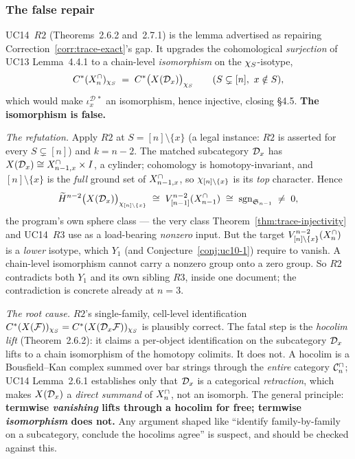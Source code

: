 \subsubsection{The false repair}

\begin{correction}
\label{corr:r2}
UC14~$R2$ (Theorems~2.6.2 and~2.7.1) is the lemma advertised as
repairing Correction~\ref{corr:trace-exact}'s gap. It upgrades the
cohomological \emph{surjection} of UC13 Lemma~4.4.1 to a chain-level
\emph{isomorphism} on the $\chi_{S}$-isotype,
\[
  C^*(X^{\cap}_n)_{\chi_{S}}\;=\;C^*\bigl(X(\mathcal{D}_x)\bigr)_{\chi_{S}}
  \qquad(S\subsetneq[n],\ x\notin S),
\]
which would make $\iota_x^{\mathcal D\,*}$ an isomorphism, hence
injective, closing \S4.5. \textbf{The isomorphism is false.}

\emph{The refutation.} Apply $R2$ at $S=[n]\setminus\{x\}$ (a legal
instance: $R2$ is asserted for every $S\subsetneq[n]$) and $k=n-2$.
The matched subcategory $\mathcal{D}_x$ has $X(\mathcal{D}_x)\cong X^{\cap}_{n-1,x}\times I$, a
cylinder; cohomology is homotopy-invariant, and $[n]\setminus\{x\}$ is
the \emph{full} ground set of $X^{\cap}_{n-1,x}$, so $\chi_{[n]\setminus\{x\}}$ is
its \emph{top} character. Hence
\[
  \widetilde H^{n-2}\bigl(X(\mathcal{D}_x)\bigr)_{\chi_{[n]\setminus\{x\}}}
  \;\cong\;V^{n-2}_{[n-1]}(X^{\cap}_{n-1})
  \;\cong\;\mathrm{sgn}_{\mathfrak{S}_{n-1}}\;\neq\;0,
\]
the program's own sphere class --- the very class
Theorem~\ref{thm:trace-injectivity} and UC14~$R3$ use as a load-bearing
\emph{nonzero} input. But the target $V_{[n]\setminus\{x\}}^{n-2}
(X^{\cap}_n)$ is a \emph{lower} isotype, which $Y_1$ (and
Conjecture~\ref{conj:uc10-1}) require to vanish. A chain-level
isomorphism cannot carry a nonzero group onto a zero group. So $R2$
contradicts both $Y_1$ and its own sibling $R3$, inside one document;
the contradiction is concrete already at $n=3$.

\emph{The root cause.} $R2$'s single-family, cell-level identification
$C^*(X(\mathcal{F}))_{\chi_{S}}=C^*(X(\mathcal{D}_x\mathcal{F}))_{\chi_{S}}$ is plausibly correct.
The fatal step is the \emph{hocolim lift} (Theorem~2.6.2): it claims a
per-object identification on the subcategory $\mathcal{D}_x$ lifts to a chain
isomorphism of the homotopy colimits. It does not. A hocolim is a
Bousfield--Kan complex summed over bar strings through the
\emph{entire} category $\mathcal{C}^{\cap}_n$; UC14 Lemma~2.6.1 establishes only that
$\mathcal{D}_x$ is a categorical \emph{retraction}, which makes $X(\mathcal{D}_x)$ a
\emph{direct summand} of $X^{\cap}_n$, not an isomorph. The general principle:
\textbf{termwise \emph{vanishing} lifts through a hocolim for free;
termwise \emph{isomorphism} does not.} Any argument shaped like
``identify family-by-family on a subcategory, conclude the hocolims
agree'' is suspect, and should be checked against this.
\end{correction}

